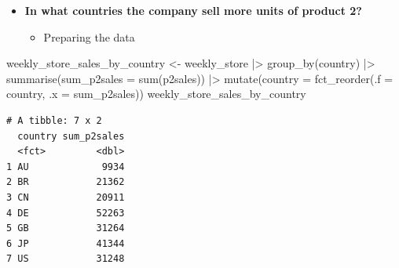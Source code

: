 \documentclass[
  ignorenonframetext,
]{beamer}
\newenvironment{Shaded}{\begin{snugshade}}{\end{snugshade}}
\newcommand{\AttributeTok}[1]{\textcolor[rgb]{0.40,0.45,0.13}{#1}}
\newcommand{\FunctionTok}[1]{\textcolor[rgb]{0.28,0.35,0.67}{#1}}
\newcommand{\NormalTok}[1]{\textcolor[rgb]{0.00,0.23,0.31}{#1}}
\newcommand{\OtherTok}[1]{\textcolor[rgb]{0.00,0.23,0.31}{#1}}
\newcommand{\SpecialCharTok}[1]{\textcolor[rgb]{0.37,0.37,0.37}{#1}}
\providecommand{\tightlist}{%
  \setlength{\itemsep}{0pt}\setlength{\parskip}{0pt}}\usepackage{longtable,booktabs,array}
\begin{document}
\begin{frame}[fragile]{}
\label{section-30}
\begin{itemize}
\item
  \textbf{In what countries the company sell more units of product 2?}

  \begin{itemize}
  \tightlist
  \item
    Preparing the data
  \end{itemize}
\end{itemize}

\tiny

\begin{Shaded}
\begin{Highlighting}[]
\NormalTok{weekly\_store\_sales\_by\_country }\OtherTok{\textless{}{-}}\NormalTok{ weekly\_store }\SpecialCharTok{|\textgreater{}} 
  \FunctionTok{group\_by}\NormalTok{(country) }\SpecialCharTok{|\textgreater{}}
  \FunctionTok{summarise}\NormalTok{(}\AttributeTok{sum\_p2sales =} \FunctionTok{sum}\NormalTok{(p2sales)) }\SpecialCharTok{|\textgreater{}}
  \FunctionTok{mutate}\NormalTok{(}\AttributeTok{country =} \FunctionTok{fct\_reorder}\NormalTok{(}\AttributeTok{.f =}\NormalTok{ country, }\AttributeTok{.x =}\NormalTok{ sum\_p2sales))}
\NormalTok{weekly\_store\_sales\_by\_country}
\end{Highlighting}
\end{Shaded}

\begin{verbatim}
# A tibble: 7 x 2
  country sum_p2sales
  <fct>         <dbl>
1 AU             9934
2 BR            21362
3 CN            20911
4 DE            52263
5 GB            31264
6 JP            41344
7 US            31248
\end{verbatim}
\end{frame}
\end{document}
